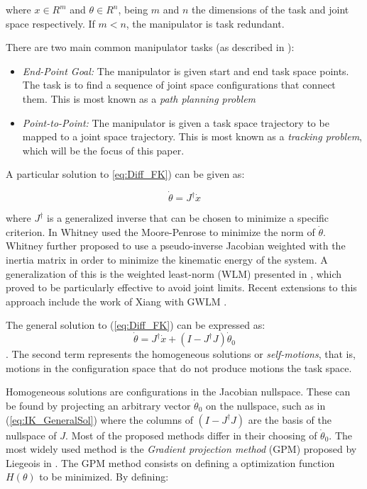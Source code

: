 \documentclass[conference]{IEEEtran}
\newcommand{\J}{ \ensuremath{J} }
\newcommand{\Jps}{ \ensuremath{J^{\dagger}} }
\newcommand{\dx}{ \ensuremath{\dot{x}} }
\newcommand{\dq}{ \ensuremath{\dot{\theta}} }
\newcommand{\q}{ \ensuremath{\theta } }
\begin{document}
where $x \in R^{m}$ and $\q \in R^{n}$, being $m$ and $n$ the dimensions
of the task and joint space respectively. If $m < n$, the manipulator is
task redundant. 

There are two main common manipulator tasks (as described in \cite{seereeram-ns-1995}):

\begin{itemize}
\item{\textit{End-Point Goal:} The manipulator is given start and end task space points. 
The task is to find a sequence of joint space configurations that connect them. 
This is most known as a \textit{path planning problem} } 
\item{\textit{Point-to-Point:} The manipulator is given a task space trajectory to be mapped
to a joint space trajectory. This is most known as a \textit{tracking problem}, which will be 
the focus of this paper.}
\end{itemize}

A particular solution to \ref{eq:Diff_FK}) can be given as:

\begin{equation}
\dq = \Jps \dx
\label{eq:IK_ParticularSol}
\end{equation}

where $\Jps$ is a generalized inverse that can be chosen to minimize a specific criterion. 
In \cite{Whitney-motionRate-1969} Whitney used the Moore-Penrose to minimize the norm of $\dq$. 
Whitney further proposed to use a pseudo-inverse Jacobian weighted with the inertia matrix in 
order to minimize the kinematic energy of the system. A generalization of this is the weighted 
least-norm (WLM) presented in \cite{chan-ns-1995}, which proved to be particularly effective 
to avoid joint limits. Recent extensions to this approach include the work of Xiang with GWLM 
\cite{xiang-ns-2010}.  

The general solution to (\ref{eq:Diff_FK}) can be expressed as:
\begin{equation}
\dq = \Jps \dx + (I - \Jps \J)\dq_{0}
\label{eq:IK_GeneralSol}
\end{equation}
. The second term represents the homogeneous solutions or \textit{self-motions}, that is, motions 
in the configuration space that do not produce motions the task space. 

Homogeneous solutions are configurations in the Jacobian nullspace. These can be found by projecting 
an arbitrary vector $\dq_{0}$ on the nullspace, such as in (\ref{eq:IK_GeneralSol}) where the columns 
of $(I - \Jps \J)$ are the basis of the nullspace of $\J$. Most of the proposed methods differ in 
their choosing of $\dq_{0}$. The most widely used method is the \textit{Gradient projection method} 
(GPM) proposed by Liegeois in \cite{liegeois-ns-1977}. The GPM method consists on defining a 
optimization function $H(\q)$ to be minimized. By defining:
\end{document}
